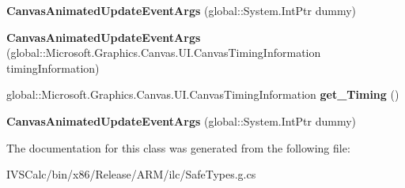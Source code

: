 \begin{DoxyCompactItemize}
{\bfseries Canvas\+Animated\+Update\+Event\+Args} (global\+::\+System.\+Int\+Ptr dummy)
\item 
\mbox{\label{class_microsoft_1_1_graphics_1_1_canvas_1_1_u_i_1_1_xaml_1_1_canvas_animated_update_event_args_a33ac1d9a90ed5bc74dc911125a125018}} 
{\bfseries Canvas\+Animated\+Update\+Event\+Args} (global\+::\+Microsoft.\+Graphics.\+Canvas.\+U\+I.\+Canvas\+Timing\+Information timing\+Information)
\item 
\mbox{\label{class_microsoft_1_1_graphics_1_1_canvas_1_1_u_i_1_1_xaml_1_1_canvas_animated_update_event_args_a3386f26482966231d3a4199aaa540918}} 
global\+::\+Microsoft.\+Graphics.\+Canvas.\+U\+I.\+Canvas\+Timing\+Information {\bfseries get\+\_\+\+Timing} ()
\item 
\mbox{\label{class_microsoft_1_1_graphics_1_1_canvas_1_1_u_i_1_1_xaml_1_1_canvas_animated_update_event_args_a022ce809a253b735d009ef6a5823ad36}} 
{\bfseries Canvas\+Animated\+Update\+Event\+Args} (global\+::\+System.\+Int\+Ptr dummy)
\end{DoxyCompactItemize}


The documentation for this class was generated from the following file\+:\begin{DoxyCompactItemize}
\item 
I\+V\+S\+Calc/bin/x86/\+Release/\+A\+R\+M/ilc/Safe\+Types.\+g.\+cs\end{DoxyCompactItemize}

